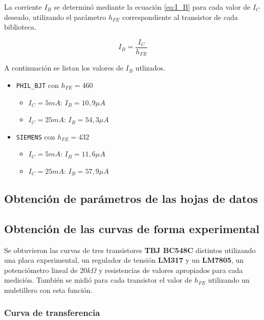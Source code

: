 \documentclass[10pt,spanish,a4paper,openany,notitlepage]{article}
\begin{document}
La corriente $I_B$ se determinó mediante la ecuación \ref{eq:I_B} para cada valor de $I_C$ deseado, utilizando el parámetro $h_{FE}$ correspondiente al transistor de cada biblioteca. 

\begin{equation}
I_B = \frac{I_C}{h_{FE}}
\label{eq:I_B}
\end{equation}

A continuación se listan los valores de $I_B$ utlizados.

\begin{itemize}
\item{\texttt{PHIL\_BJT} con $h_{FE} = 460$}
\begin{itemize}
\item{$I_C = 5 \unit{mA}$}: $I_B = 10,9\unit{\mu A}$
\item{$I_C = 25 \unit{mA}$}: $I_B = 54,3\unit{\mu A}$
\end{itemize}
\item{\texttt{SIEMENS} con $h_{FE} = 432$}
\begin{itemize}
\item{$I_C = 5 \unit{mA}$}: $I_B = 11,6\unit{\mu A}$
\item{$I_C = 25 \unit{mA}$}: $I_B = 57,9\unit{\mu A}$
\end{itemize}
\end{itemize}

\subsection{Obtención de parámetros de las hojas de datos}

\subsection{Obtención de las curvas de forma experimental}

Se obtuvieron las curvas de tres transistores \textbf{TBJ BC548C} distintos utilizando una placa experimental, un regulador de tensión \textbf{LM317} y un \textbf{LM7805}, un potenciómetro lineal de $20\unit{k\Omega}$ y resistencias de valores apropiados para cada medición.
También se midió para cada transistor el valor de $h_{FE}$ utilizando un muletillero con esta función.

\subsubsection{Curva de transferencia}
\end{document}
